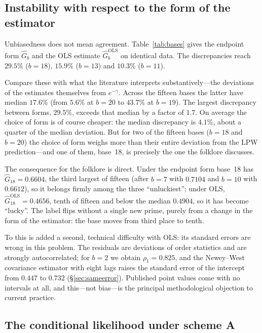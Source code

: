\documentclass[11pt,a4paper]{article}
\theoremstyle{plain}
\theoremstyle{remark}
\newcommand{\emg}{e^{-\gamma}}
\begin{document}
\subsection{Instability with respect to the form of the estimator}\label{sec:instability}

Unbiasedness does not mean agreement. Table~\ref{tab:bases} gives the endpoint
form $\hat G_b$ and the OLS estimate $\hat G_b^{\mathrm{OLS}}$ on identical
data. The discrepancies reach $29.5\%$ ($b=18$), $15.9\%$ ($b=13$) and $10.3\%$
($b=11$).

Compare these with what the literature interprets substantively---the deviations
of the estimates themselves from $\emg$. Across the fifteen bases the latter
have median $17.6\%$ (from $5.6\%$ at $b=20$ to $43.7\%$ at $b=19$). The largest
discrepancy between forms, $29.5\%$, exceeds that median by a factor of $1.7$.
On average the choice of form is of course cheaper: the median discrepancy is
$4.1\%$, about a quarter of the median deviation. But for two of the fifteen
bases ($b=18$ and $b=20$) the choice of form weighs more than their entire
deviation from the LPW prediction---and one of them, base~18, is precisely the
one the folklore discusses.

The consequence for the folklore is direct. Under the endpoint form base~18 has
$\hat G_{18}=0.6604$, the third largest of fifteen (after $b=7$ with $0.7104$
and $b=10$ with $0.6612$), so it belongs firmly among the three ``unluckiest'';
under OLS, $\hat G_{18}^{\mathrm{OLS}}=0.4656$, tenth of fifteen and below the
median $0.4904$, so it has become ``lucky''. The label flips without a single
new prime, purely from a change in the form of the estimator: the base moves
from third place to tenth.

To this is added a second, technical difficulty with OLS: its standard errors
are wrong in this problem. The residuals are deviations of order statistics and
are strongly autocorrelated; for $b=2$ we obtain $\rho_1=0.825$, and the
Newey--West covariance estimator with eight lags raises the standard error of
the intercept from $0.447$ to $0.732$ (\S\ref{sec:sameerror}). Published point
values come with no intervals at all, and this---not bias---is the principal
methodological objection to current practice.

\subsection{The conditional likelihood under scheme A}\label{sec:condlik}
\end{document}
